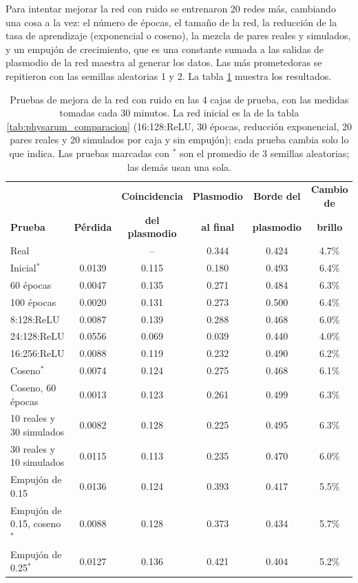 Para intentar mejorar la red con ruido se entrenaron 20 redes más, cambiando una cosa a la vez: el número de épocas, el tamaño de la red, la reducción de la tasa de aprendizaje (exponencial o coseno), la mezcla de pares reales y simulados, y un empujón de crecimiento, que es una constante sumada a las salidas de plasmodio de la red maestra al generar los datos. Las más prometedoras se repitieron con las semillas aleatorias 1 y 2. La tabla \ref{tab:physarum_mejoras} muestra los resultados.

\begin{table}[htbp]
	\centering
	\footnotesize
	\setlength{\tabcolsep}{3.5pt}
	\begin{tabular}{@{}lccccc@{}}
		\toprule
		& & \textbf{Coincidencia} & \textbf{Plasmodio} & \textbf{Borde del} & \textbf{Cambio de} \\
		\textbf{Prueba} & \textbf{Pérdida} & \textbf{del plasmodio} & \textbf{al final} & \textbf{plasmodio} & \textbf{brillo} \\ \midrule
		Real & & -- & 0.344 & 0.424 & 4.7\% \\ \midrule
		Inicial$^*$ & 0.0139 & 0.115 & 0.180 & 0.493 & 6.4\% \\
		60 épocas & 0.0047 & 0.135 & 0.271 & 0.484 & 6.3\% \\
		100 épocas & 0.0020 & 0.131 & 0.273 & 0.500 & 6.4\% \\
		8:128:ReLU & 0.0087 & 0.139 & 0.288 & 0.468 & 6.0\% \\
		24:128:ReLU & 0.0556 & 0.069 & 0.039 & 0.440 & 4.0\% \\
		16:256:ReLU & 0.0088 & 0.119 & 0.232 & 0.490 & 6.2\% \\
		Coseno$^*$ & 0.0074 & 0.124 & 0.275 & 0.468 & 6.1\% \\
		Coseno, 60 épocas & 0.0013 & 0.123 & 0.261 & 0.499 & 6.3\% \\
		10 reales y 30 simulados & 0.0082 & 0.128 & 0.225 & 0.495 & 6.3\% \\
		30 reales y 10 simulados & 0.0115 & 0.113 & 0.235 & 0.470 & 6.0\% \\
		Empujón de 0.15 & 0.0136 & 0.124 & 0.393 & 0.417 & 5.5\% \\
		Empujón de 0.15, coseno$^*$ & 0.0088 & 0.128 & 0.373 & 0.434 & 5.7\% \\
		Empujón de 0.25$^*$ & 0.0127 & 0.136 & 0.421 & 0.404 & 5.2\% \\
		\bottomrule
	\end{tabular}
	\caption{Pruebas de mejora de la red con ruido en las 4 cajas de prueba, con las medidas tomadas cada 30 minutos. La red inicial es la de la tabla \ref{tab:physarum_comparacion} (16:128:ReLU, 30 épocas, reducción exponencial, 20 pares reales y 20 simulados por caja y sin empujón); cada prueba cambia solo lo que indica. Las pruebas marcadas con $^*$ son el promedio de 3 semillas aleatorias; las demás usan una sola.}
	\label{tab:physarum_mejoras}
\end{table}

